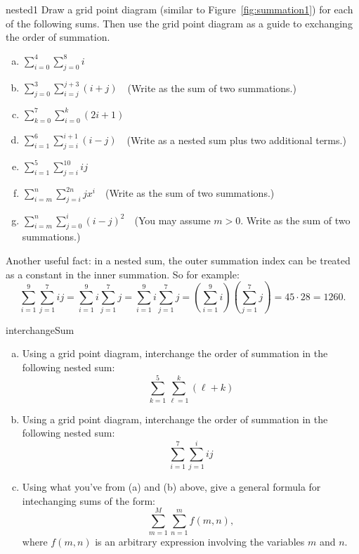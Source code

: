\begin{exercise}{nested1}
Draw a grid point diagram (similar to Figure~\ref{fig:summation1}) for each of the following sums.  Then use the grid point diagram  as a guide to exchanging the order of summation.
\begin{enumerate}[(a)]
\item
$\displaystyle{\sum_{i=0}^{4}\sum_{j=0}^{8}i}$
\item
$\displaystyle{\sum_{j=0}^{3} \sum_{i=j}^{j+3} (i+j)}$~~(Write as the sum of two summations.)
\item
$\displaystyle{\sum_{k=0}^{7}\sum_{i=0}^{k}(2i+1) }$
\item
$\displaystyle{\sum_{i=1}^{6}\sum_{j=i}^{i+1} (i-j) }$~~(Write as a nested sum plus two additional terms.)
\item
$\displaystyle{\sum_{i=1}^{5}\sum_{j=i}^{10} ij }$
\item
$\displaystyle{\sum_{i=m}^{n}\sum_{j=i}^{2n}jx^i }$~~(Write as the sum of two summations.)
\item
$\displaystyle{\sum_{i=m}^{n}\sum_{j=0}^{i}(i-j)^2 }$~~(You may assume $m>0$.  Write as the sum of two summations.)
\end {enumerate}
\end{exercise}
Another useful fact: in a nested sum, the outer summation index can be treated as a constant in the inner summation.  So for example:
\[ \sum_{i=1}^{9} \sum_{j=1}^7 ij = \sum_{i=1}^{9} i \sum_{j=1}^7 j = \sum_{i=1}^{9} i\sum_{j=1}^7 j = \left(\sum_{i=1}^{9} i\right) \left(\sum_{j=1}^7 j\right) = 45\cdot 28=1260. \]

\begin{exercise}{interchangeSum}
\begin{enumerate}[(a)]
\item
Using a grid point diagram, interchange the order of summation in the following nested sum:
\[
\sum_{k=1}^{5} \sum_{\ell=1}^k (\ell + k)
\]
\item
Using a grid point diagram, interchange the order of summation in the following nested sum:
\[
\sum_{i=1}^{7} \sum_{j=1}^i ij
\]
\item
Using what you've from (a) and (b) above, give a general formula for intechanging sums of the form:
\[
\sum_{m=1}^M \sum_{n=1}^m f(m,n),
\]
where $f(m,n)$ is an arbitrary expression involving the variables $m$ and $n$.
\end{enumerate}
\end{exercise}

